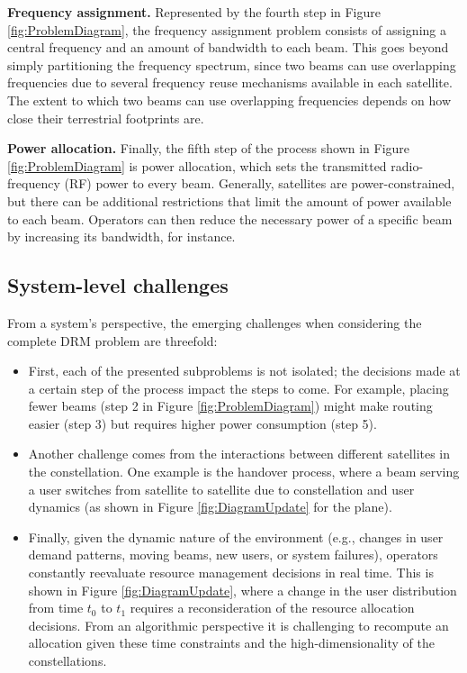 \documentclass[letterpaper]{article} %
\begin{document}
\textbf{Frequency assignment.}
Represented by the fourth step in Figure \ref{fig:ProblemDiagram}, the frequency assignment problem consists of assigning a central frequency and an amount of bandwidth to each beam. This goes beyond simply partitioning the frequency spectrum, since two beams can use overlapping frequencies due to several frequency reuse mechanisms available in each satellite. The extent to which two beams can use overlapping frequencies depends on how close their terrestrial footprints are.

\textbf{Power allocation.}
Finally, the fifth step of the process shown in Figure \ref{fig:ProblemDiagram} is power allocation, which sets the transmitted radio-frequency (RF) power to every beam. Generally, satellites are power-constrained, but there can be additional restrictions that limit the amount of power available to each beam. Operators can then reduce the necessary power of a specific beam by increasing its bandwidth, for instance.


\subsection{System-level challenges}
\label{sec:2.3}
From a system's perspective, the emerging challenges when considering the complete DRM problem are threefold:
\begin{itemize}
\item First, each of the presented subproblems is not isolated; the decisions made at a certain step of the process impact the steps to come. For example, placing fewer beams (step 2 in Figure \ref{fig:ProblemDiagram}) might make routing easier (step 3) but requires higher power consumption (step 5).
\item Another challenge comes from the interactions between different satellites in the constellation. One example is the handover process, where a beam serving a user switches from satellite to satellite due to constellation and user dynamics (as shown in Figure \ref{fig:DiagramUpdate} for the plane).
\item Finally, given the dynamic nature of the environment (e.g., changes in user demand patterns, moving beams, new users, or system failures), operators constantly reevaluate resource management decisions in real time. This is shown in Figure \ref{fig:DiagramUpdate}, where a change in the user distribution from time $t_0$ to $t_1$ requires a reconsideration of the resource allocation decisions. From an algorithmic perspective it is challenging to recompute an allocation given these time constraints and the high-dimensionality of the constellations.
\end{itemize}
\end{document}
